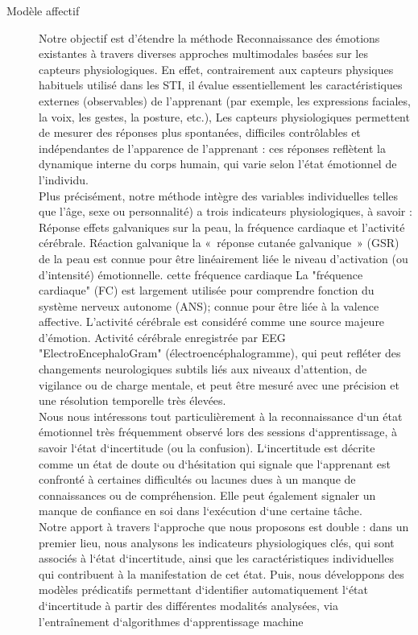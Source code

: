 \begin{description}
\item[Modèle affectif]
Notre objectif est d'étendre la méthode Reconnaissance des émotions existantes à travers diverses approches multimodales basées sur les capteurs physiologiques. En effet, contrairement aux capteurs physiques habituels utilisé dans les STI, il évalue essentiellement les caractéristiques externes (observables) de l'apprenant (par exemple, les expressions faciales, la voix, les gestes, la posture, etc.),
Les capteurs physiologiques permettent de mesurer des réponses plus spontanées, difficiles contrôlables et indépendantes de l'apparence de l'apprenant : ces réponses reflètent la dynamique interne du corps humain, qui varie selon l'état émotionnel de l'individu.\cite{jraidi_2013}\\
Plus précisément, notre méthode intègre des variables individuelles telles que l'âge, sexe ou personnalité) a trois indicateurs physiologiques, à savoir : Réponse effets galvaniques sur la peau, la fréquence cardiaque et l'activité cérébrale. Réaction galvanique la « réponse cutanée galvanique » (GSR) de la peau est connue pour être linéairement liée le niveau d'activation (ou d'intensité) émotionnelle. cette fréquence cardiaque La "fréquence cardiaque" (FC) est largement utilisée pour comprendre fonction du système nerveux autonome (ANS); connue pour être liée à la valence affective. L'activité cérébrale est considéré comme une source majeure d'émotion. Activité cérébrale enregistrée par EEG "ElectroEncephaloGram" (électroencéphalogramme), qui peut refléter des changements neurologiques subtils liés aux niveaux d'attention, de vigilance ou de charge mentale, et peut être mesuré avec une précision et une résolution temporelle très élevées.\\

Nous nous intéressons tout particulièrement à la reconnaissance d‘un état émotionnel
très fréquemment observé lors des sessions d‘apprentissage, à savoir l‘état d‘incertitude (ou la confusion). L‘incertitude est décrite comme un état de doute ou d‘hésitation qui signale que l‘apprenant est confronté à certaines difficultés ou lacunes dues à un manque de connaissances ou de compréhension. Elle peut également signaler un manque de confiance en soi dans l‘exécution d‘une certaine tâche. \\

Notre apport à travers l‘approche que nous proposons est double : dans un premier lieu, nous analysons les indicateurs physiologiques clés, qui sont associés à l‘état d‘incertitude, ainsi que les caractéristiques individuelles qui contribuent à la manifestation de cet état. Puis, nous développons des modèles prédicatifs permettant d‘identifier automatiquement l‘état d‘incertitude à partir des différentes modalités analysées, via l'entraînement d‘algorithmes d‘apprentissage machine
\end{description}

